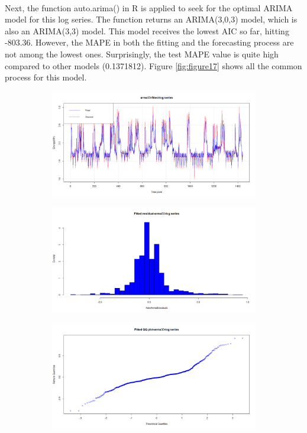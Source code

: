 \documentclass[12pt]{article}
\begin{document}
\paragraph{}
Next, the function auto.arima() in R is applied to seek for the optimal ARIMA model for this log series. The function returns an ARIMA(3,0,3) model, which is also an ARIMA(3,3) model. This model receives the lowest AIC so far, hitting -803.36. However, the MAPE in both the fitting and the forecasting process are not among the lowest ones. Surprisingly, the test MAPE value is quite high compared to other models (0.1371812). Figure \ref{fig:figure17} shows all the common process for this model.
\begin{figure}[H]
  \centering
  \begin{subfigure}[b]{0.49\linewidth}
    \includegraphics[width=\linewidth]{figure16-1.png}
  \end{subfigure}
  \begin{subfigure}[b]{0.49\linewidth}
    \includegraphics[width=\linewidth]{figure16-2.png}
  \end{subfigure}
  \begin{subfigure}[b]{0.49\linewidth}
    \includegraphics[width=\linewidth]{figure16-3.png}

\end{subfigure}
\end{figure}
\end{document}
